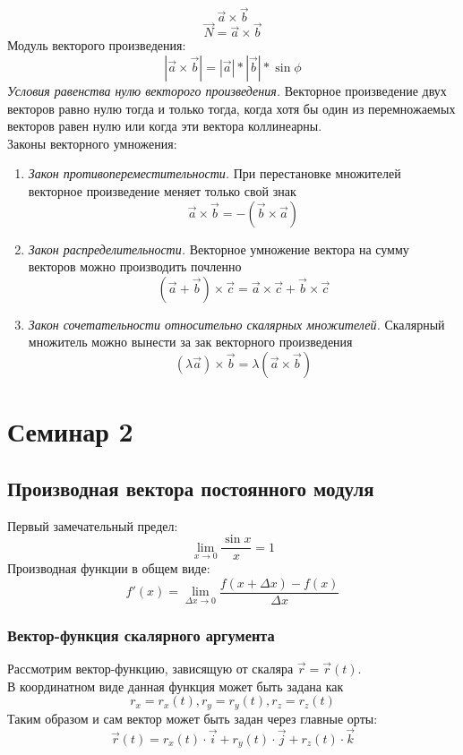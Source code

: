 \documentclass{article}
\begin{document}
\begin{enumerate}
\begin{enumerate}
    \end{enumerate}
    $$\vec{a}\times\vec{b}$$
    $$\vec{N} = \vec{a}\times\vec{b}$$
    Модуль векторого произведения:
    $$|\vec{a}\times\vec{b}| = |\vec{a}|*|\vec{b}|*\sin\phi$$
    \textit{Условия равенства нулю векторого произведения.} Векторное произведение двух векторов равно нулю тогда и только тогда, когда хотя бы один из перемножаемых векторов равен нулю или когда эти вектора коллинеарны. \\
    Законы векторного умножения:
    \begin{enumerate}
        \item \textit{Закон противопереместительности.} При перестановке множителей векторное произведение меняет только свой знак
        $$\vec{a}\times\vec{b} = -(\vec{b}\times\vec{a})$$
        \item \textit{Закон распределительности.} Векторное умножение вектора на сумму векторов можно производить почленно
        $$(\vec{a}+\vec{b})\times\vec{c} = \vec{a}\times\vec{c} + \vec{b}\times\vec{c} $$
        \item \textit{Закон сочетательности относительно скалярных множителей.} Скалярный множитель можно вынести за зак векторного произведения
        $$(\lambda\vec{a})\times\vec{b} = \lambda(\vec{a}\times\vec{b})$$
    \end{enumerate}
\end{enumerate}


\section{Семинар 2}

  \subsection{Производная вектора постоянного модуля}
  Первый замечательный предел:
  $$\lim_{x \rightarrow 0} \frac{\sin x}{x} = 1$$
  Производная функции в общем виде:
  $$f'(x) = \lim_{\Delta x \rightarrow 0} \frac{f(x + \Delta x) - f(x)}{\Delta x}$$

  \subsubsection{Вектор-функция скалярного аргумента}
  \par Рассмотрим вектор-функцию, зависящую от скаляра $\vec{r} = \vec{r}(t)$.\\
  В координатном виде данная функция может быть задана как 
  $$r_x = r_x(t), r_y=r_y(t), r_z = r_z(t)$$ 
  Таким образом и сам вектор может быть задан через главные орты: 
  $$\vec{r}(t) = r_x(t)\cdot\vec{i}+r_y(t)\cdot\vec{j}+r_z(t)\cdot\vec{k}$$
\end{document}
